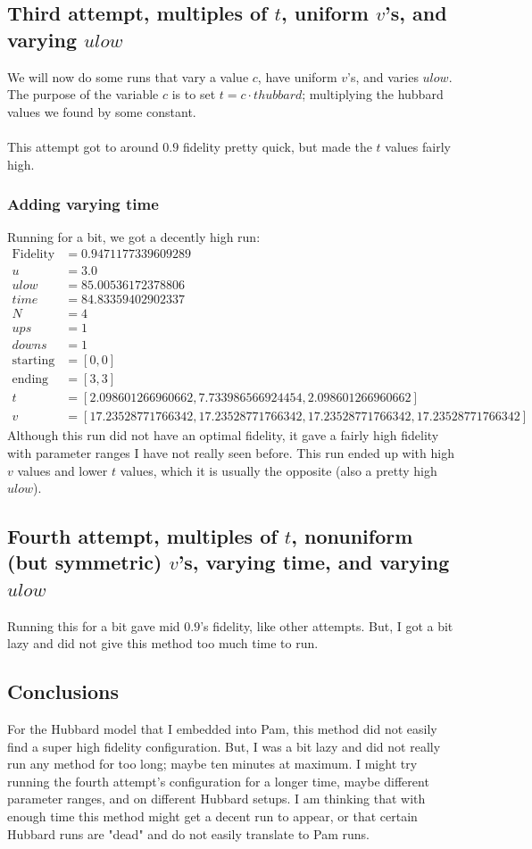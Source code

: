 \subsection{Third attempt, multiples of $t$, uniform $v$'s, and varying $ulow$}
We will now do some runs that vary a value $c$, have uniform $v$'s, and varies $ulow$.
The purpose of the variable $c$ is to set $t=c\cdot thubbard$; multiplying the hubbard values we found by some constant. \\
\\
This attempt got to around $0.9$ fidelity pretty quick, but made the $t$ values fairly high.
\subsubsection{Adding varying time}
Running for a bit, we got a decently high run:
\begin{align*}
    \text{Fidelity} &= 0.9471177339609289 \\
    u &= 3.0 \\
    ulow &= 85.00536172378806 \\
    time &= 84.83359402902337 \\
    N &= 4 \\
    ups &= 1 \\
    downs &= 1 \\
    \text{starting} &= [0,0]\\
    \text{ending} &=  [3,3] \\
    t &= [2.098601266960662,7.733986566924454,2.098601266960662] \\
    v &= [17.23528771766342,17.23528771766342,17.23528771766342,17.23528771766342]
\end{align*}
Although this run did not have an optimal fidelity, it gave a fairly high fidelity with parameter ranges I have not really seen before.
This run ended up with high $v$ values and lower $t$ values, which it is usually the opposite (also a pretty high $ulow$).
\subsection{Fourth attempt, multiples of $t$, nonuniform (but symmetric) $v$'s, varying time, and varying $ulow$}
Running this for a bit gave mid $0.9$'s fidelity, like other attempts.
But, I got a bit lazy and did not give this method too much time to run.
\subsection{Conclusions}
For the Hubbard model that I embedded into Pam, this method did not easily find a super high fidelity configuration.
But, I was a bit lazy and did not really run any method for too long; maybe ten minutes at maximum.
I might try running the fourth attempt's configuration for a longer time, maybe different parameter ranges, and on different Hubbard setups.
I am thinking that with enough time this method might get a decent run to appear, or that certain Hubbard runs are "dead" and do not easily translate to Pam runs.








